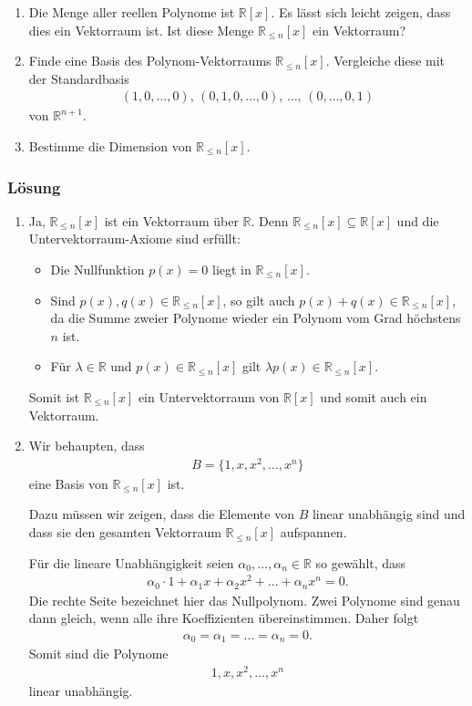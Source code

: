 \documentclass[a4paper,10pt]{article}
\newcommand{\R}{\mathbb{R}}
\newcommand{\s}[1]{#1}
\begin{document}
\begin{enumerate}[label=(\alph*)]
\item Die Menge aller reellen Polynome ist $\R[x]$. Es lässt sich leicht zeigen, dass dies ein Vektorraum ist. Ist diese Menge $\R_{\leq n}[x]$ ein Vektorraum?
\item Finde eine Basis des Polynom-Vektorraums $\R_{\leq n}[x]$. Vergleiche diese mit der Standardbasis
\begin{align*}
    (1,0,\dots,0),\,(0,1,0,\dots,0),\,\dots,\,(0,\dots,0,1)
\end{align*}
von $\R^{n+1}$.

\item Bestimme die Dimension von $\R_{\leq n}[x]$.  

\end{enumerate}
\s{\subsubsection*{Lösung}
\begin{enumerate}[label=(\alph*)]
\item Ja, $\R_{\leq n}[x]$ ist ein Vektorraum über $\R$. Denn $\R_{\leq n}[x]\subseteq \R[x]$ und die Untervektorraum-Axiome sind erfüllt:  
\begin{itemize}
\item Die Nullfunktion $p(x)=0$ liegt in $\R_{\leq n}[x]$.  
\item Sind $p(x),q(x)\in \R_{\leq n}[x]$, so gilt auch $p(x)+q(x)\in \R_{\leq n}[x]$, da die Summe zweier Polynome wieder ein Polynom vom Grad höchstens $n$ ist.  
\item Für $\lambda\in\R$ und $p(x)\in \R_{\leq n}[x]$ gilt $\lambda p(x)\in \R_{\leq n}[x]$.  
\end{itemize}
Somit ist $\R_{\leq n}[x]$ ein Untervektorraum von $\R[x]$ und somit auch ein Vektorraum.

\item
Wir behaupten, dass
\begin{align*}
    B=\{1,x,x^2,\ldots,x^n\}
\end{align*}
eine Basis von $\R_{\leq n}[x]$ ist.

Dazu müssen wir zeigen, dass die Elemente von $B$ linear unabhängig sind und dass sie den gesamten Vektorraum $\R_{\leq n}[x]$ aufspannen.

Für die lineare Unabhängigkeit seien $\alpha_0,\ldots,\alpha_n\in\R$ so gewählt, dass
\begin{align*}
    \alpha_0\cdot 1
    +\alpha_1x
    +\alpha_2x^2
    +\ldots
    +\alpha_nx^n
    =0.
\end{align*}
Die rechte Seite bezeichnet hier das Nullpolynom. Zwei Polynome sind genau dann gleich, wenn alle ihre Koeffizienten übereinstimmen. Daher folgt
\begin{align*}
    \alpha_0=\alpha_1=\ldots=\alpha_n=0.
\end{align*}
Somit sind die Polynome
\begin{align*}
    1,x,x^2,\ldots,x^n
\end{align*}
linear unabhängig.


\end{enumerate}}
\end{document}
